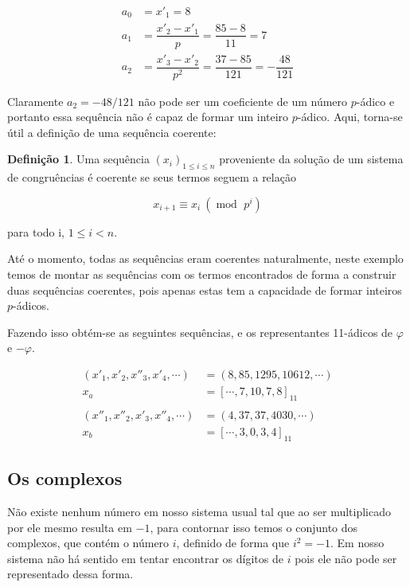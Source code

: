 \documentclass{report}
\newcommand*{\padc}[2]{\left[#1\right]_{#2}}
\DeclareMathOperator{\modulo}{mod \ }
\theoremstyle{definition}
\newtheorem{definition}{Definição}[section]
\begin{document}
\begin{align*}
    a_0 &= x'_1 = 8 \\
    a_1 &= \dfrac{x'_2-x'_1}{p} = \dfrac{85-8}{11} = 7 \\
    a_2 &= \dfrac{x'_3-x'_2}{p^2} = \dfrac{37-85}{121} = -\dfrac{48}{121}
\end{align*}

Claramente $a_2 = -48/121$ não pode ser um coeficiente de um número $p$-ádico e portanto essa sequência não é capaz de formar um inteiro $p$-ádico. Aqui, torna-se útil a definição de uma sequência coerente:

\begin{definition}
    Uma sequência $\left( x_i \right)_{1 \leq i \leq n}$ proveniente da solução de um sistema de congruências é coerente se seus termos seguem a relação

    \begin{equation*}
        x_{i+1} \equiv x_i \ (\modulo p^i)
    \end{equation*}

    para todo i, $1 \leq i < n$.
\end{definition}

Até o momento, todas as sequências eram coerentes naturalmente, neste exemplo temos de montar as sequências com os termos encontrados de forma a construir duas sequências coerentes, pois apenas estas tem a capacidade de formar inteiros $p$-ádicos.

Fazendo isso obtém-se as seguintes sequências, e os representantes 11-ádicos de $\varphi$ e $-\varphi$.

\begin{align*}
    (x'_1, x'_2, x''_3, x'_4, \cdots) &= (8, 85, 1295, 10612, \cdots) \\
     x_a &= \padc{\cdots, 7, 10, 7, 8}{11} \\
    &\\
    (x''_1, x''_2, x'_3, x''_4, \cdots) &= (4, 37, 37, 4030, \cdots) \\
     x_b &= \padc{\cdots, 3, 0, 3, 4}{11}
\end{align*}

\subsection{Os complexos}

Não existe nenhum número em nosso sistema usual tal que ao ser multiplicado por ele mesmo resulta em $-1$, para contornar isso temos o conjunto dos complexos, que contém o número $i$, definido de forma que $i^2 = -1$. Em nosso sistema não há sentido em tentar encontrar os dígitos de $i$ pois ele não pode ser representado dessa forma.
\end{document}
